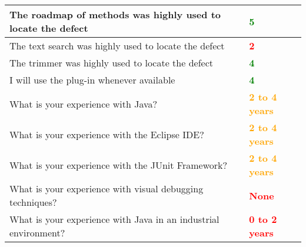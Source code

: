 \begin{table}
\begin{tabular}{m{11cm} | l}
    The roadmap of methods was highly used to locate the defect
    &\textbf{\textcolor{green}{5}} \\ \hline The text search was highly used to locate the defect &\textbf{\textcolor{red}{2}} \\ \hline
    The trimmer was highly used to locate the defect &\textbf{\textcolor{green}{4}} \\ \hline
    I will use the plug-in whenever available &\textbf{\textcolor{green}{4}} \\ \hline
    What is your experience with Java? & \textbf{\textcolor{orange}{2 to 4 years}} \\ \hline
    What is your experience with the Eclipse IDE? & \textbf{\textcolor{orange}{2 to 4 years}} \\ \hline
    What is your experience with the JUnit Framework? & \textbf{\textcolor{orange}{2 to 4 years}} \\ \hline
    What is your experience with visual debugging techniques? & \textbf{\textcolor{red}{None}} \\ \hline
    What is your experience with Java in an industrial environment? & \textbf{\textcolor{red}{0 to 2 years}} \\
    \hline
\end{tabular}
\label{tab:pilot_answers}
\end{table}

